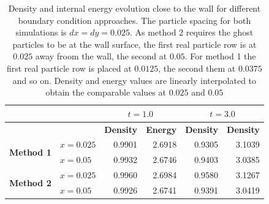 \documentclass{report}
\begin{document}
\begin{table}[h] %
\label{tab:2DSPH_LinearWall_Poiseuille_WallErrorsRho_e}
\centering
\begin{tabular}[c]{||c||l||r|r||r|r||} %
\hline
&&\multicolumn{2}{|c|}{\textbf{$t=1.0$}}& \multicolumn{2}{|c|}{\textbf{$t=3.0$}}\\
\hline
 &&{\bf Density} & {\bf Energy} & {\bf Density}& {\bf Density}\\
\hline
\hline
\multirow{2}{*}{{\bf Method 1}} &$x=0.025$&0.9901 & 2.6918 & 0.9305& 3.1039 \\
\hline
&$x=0.05$&0.9932 &2.6746 &0.9403 & 3.0385\\
\hline
\multirow{2}{*}{{\bf Method 2}}&$x=0.025$&0.9960 & 2.6984& 0.9580 & 3.1267 \\
\hline
&$x=0.05$&0.9926 & 2.6741 & 0.9391&3.0419 \\
\hline
\hline
\end{tabular}
\caption[]{Density and internal energy evolution close to the wall for different boundary condition approaches. The particle spacing for both simulations is $dx=dy=0.025$. As method 2 requires the ghost particles to be at the wall surface, the first real particle row is at $0.025$ away froom the wall, the second at $0.05$. For method 1 the first real particle row is placed at $0.0125$, the second them at $0.0375$ and so on. Density and energy values are linearly interpolated to obtain the comparable values at $0.025$ and $0.05$}
\end{table}
\end{document}
